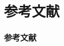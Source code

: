 \documentclass[11pt,presentation]{beamer}
\begin{document}
\section{参考文献}
\label{sec-4}
\begin{frame}[allowframebreaks]
\frametitle{参考文献}
\label{sec-4-1}

\scriptsize


\end{frame}
\end{document}
